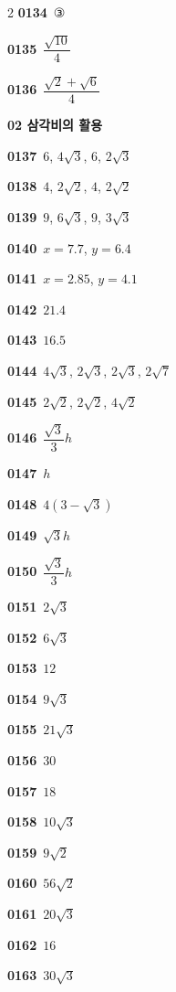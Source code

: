 \documentclass[10pt,a4paper]{article}
\begin{document}
\begin{multicols}{2}
\noindent\textbf{0134}\ ③\par
\noindent\textbf{0135}\ $\dfrac{\sqrt{10}}{4}$\par
\noindent\textbf{0136}\ $\dfrac{\sqrt{2}+\sqrt{6}}{4}$\par
\noindent\textbf{02 삼각비의 활용}\par\smallskip
\noindent\textbf{0137}\ $6$, $4\sqrt{3}$, $6$, $2\sqrt{3}$\par
\noindent\textbf{0138}\ $4$, $2\sqrt{2}$, $4$, $2\sqrt{2}$\par
\noindent\textbf{0139}\ $9$, $6\sqrt{3}$, $9$, $3\sqrt{3}$\par
\noindent\textbf{0140}\ $x=7.7$, $y=6.4$\par
\noindent\textbf{0141}\ $x=2.85$, $y=4.1$\par
\noindent\textbf{0142}\ $21.4$\par
\noindent\textbf{0143}\ $16.5$\par
\noindent\textbf{0144}\ $4\sqrt{3}$, $2\sqrt{3}$, $2\sqrt{3}$, $2\sqrt{7}$\par
\noindent\textbf{0145}\ $2\sqrt{2}$, $2\sqrt{2}$, $4\sqrt{2}$\par
\noindent\textbf{0146}\ $\dfrac{\sqrt{3}}{3}h$\par
\noindent\textbf{0147}\ $h$\par
\noindent\textbf{0148}\ $4(3-\sqrt{3})$\par
\noindent\textbf{0149}\ $\sqrt{3}h$\par
\noindent\textbf{0150}\ $\dfrac{\sqrt{3}}{3}h$\par
\noindent\textbf{0151}\ $2\sqrt{3}$\par
\noindent\textbf{0152}\ $6\sqrt{3}$\par
\noindent\textbf{0153}\ $12$\par
\noindent\textbf{0154}\ $9\sqrt{3}$\par
\noindent\textbf{0155}\ $21\sqrt{3}$\par
\noindent\textbf{0156}\ $30$\par
\noindent\textbf{0157}\ $18$\par
\noindent\textbf{0158}\ $10\sqrt{3}$\par
\noindent\textbf{0159}\ $9\sqrt{2}$\par
\noindent\textbf{0160}\ $56\sqrt{2}$\par
\noindent\textbf{0161}\ $20\sqrt{3}$\par
\noindent\textbf{0162}\ $16$\par
\noindent\textbf{0163}\ $30\sqrt{3}$\par

\end{multicols}
\end{document}

